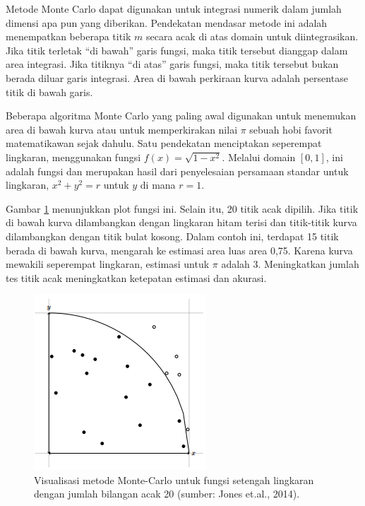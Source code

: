 \documentclass[
]{book}
\theoremstyle{definition}
\theoremstyle{definition}
\theoremstyle{definition}
\theoremstyle{definition}
\theoremstyle{remark}
\begin{document}
Metode Monte Carlo dapat digunakan untuk integrasi numerik dalam jumlah dimensi apa pun yang diberikan. Pendekatan mendasar metode ini adalah menempatkan beberapa titik \(m\) secara acak di atas domain untuk diintegrasikan. Jika titik terletak ``di bawah'' garis fungsi, maka titik tersebut dianggap dalam area integrasi. Jika titiknya ``di atas'' garis fungsi, maka titik tersebut bukan berada diluar garis integrasi. Area di bawah perkiraan kurva adalah persentase titik di bawah garis.

Beberapa algoritma Monte Carlo yang paling awal digunakan untuk menemukan area di bawah kurva atau untuk memperkirakan nilai \(\pi\) sebuah hobi favorit matematikawan sejak dahulu. Satu pendekatan menciptakan seperempat lingkaran, menggunakan fungsi \(f \left(x\right) = \sqrt{1-x^2}\). Melalui domain \(\left[0, 1\right]\), ini adalah fungsi dan merupakan hasil dari penyelesaian persamaan standar untuk lingkaran, \(x^2 + y^2 = r\) untuk \(y\) di mana \(r = 1\).

Gambar \ref{fig:monteviz} menunjukkan plot fungsi ini. Selain itu, 20 titik acak dipilih. Jika titik di bawah kurva dilambangkan dengan lingkaran hitam terisi dan titik-titik kurva dilambangkan dengan titik bulat kosong. Dalam contoh ini, terdapat 15 titik berada di bawah kurva, mengarah ke estimasi area luas area 0,75. Karena kurva mewakili seperempat lingkaran, estimasi untuk \(\pi\) adalah 3. Meningkatkan jumlah tes titik acak meningkatkan ketepatan estimasi dan akurasi.

\begin{figure}

{\centering \includegraphics[width=0.7\linewidth]{./images/monte} 

}

\caption{Visualisasi metode Monte-Carlo untuk fungsi setengah lingkaran dengan jumlah bilangan acak 20 (sumber: Jones et.al., 2014).}\label{fig:monteviz}
\end{figure}
\end{document}
